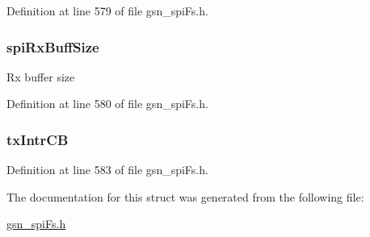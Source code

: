 Definition at line 579 of file gsn\_\-spiFs.h.

\hypertarget{a00233_a0b720c9f52a6b5aa0634f432850766ec}{
\subsubsection[{spiRxBuffSize}]{ {\bf spiRxBuffSize}}}
\label{a00233_a0b720c9f52a6b5aa0634f432850766ec}
Rx buffer size 

Definition at line 580 of file gsn\_\-spiFs.h.

\hypertarget{a00233_a6325a4c01ac28ef24556da869462013f}{
\subsubsection[{txIntrCB}]{ {\bf txIntrCB}}}
\label{a00233_a6325a4c01ac28ef24556da869462013f}


Definition at line 583 of file gsn\_\-spiFs.h.



The documentation for this struct was generated from the following file:\begin{DoxyCompactItemize}
\item 
\hyperlink{a00589}{gsn\_\-spiFs.h}\end{DoxyCompactItemize}
